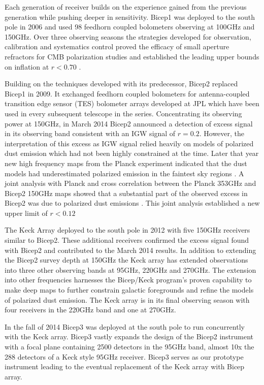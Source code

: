 \documentclass[12pt]{article}
\begin{document}
Each generation of receiver builds on the experience gained from
the previous generation while pushing deeper in sensitivity.
Bicep1 was deployed to the south pole in 2006 and used 98 feedhorn coupled
bolometers observing at 100GHz and 150GHz. Over three observing seasons the
strategies developed for observation, calibration and systematics control
proved the efficacy of small aperture refractors for CMB polarization studies
and established the leading upper bounds on inflation at $r<0.70$
\cite{cite:Bicep1}.

Building on the techniques developed with its predecessor, Bicep2 replaced
Bicep1 in 2009. It exchanged feedhorn coupled bolometers for antenna-coupled
transition edge sensor (TES) bolometer arrays developed at JPL which have been
used in every subsequent telescope in the series. Concentrating its observing
power at 150GHz, in March 2014 Bicep2 announced a detection of excess signal
in its observing band consistent with an IGW signal of $r=0.2$\cite{cite:BK1}.
However, the interpretation of this excess as IGW signal relied heavily on
models of polarized dust emission which had not been highly constrained at the
time. Later that year new high frequency maps from the Planck experiment
indicated that the dust models had underestimated polarized emission in the
faintest sky regions \cite{cite:PlanckXIX}. A joint analysis with Planck and
cross correlation between the Planck 353GHz and Bicep2 150GHz maps showed that
a substantial part of the observed excess in Bicep2 was due to polarized dust
emissions \cite{cite:BKP}. This joint analysis established a new upper limit
of $r<0.12$

The Keck Array deployed to the south pole in 2012 with five 150GHz receivers
similar to Bicep2. These additional receivers confirmed the excess signal
found with Bicep2 and contributed to the March 2014 results. In addition to
extending the Bicep2 survey depth at 150GHz the Keck array has extended
observations into three other observing bands at 95GHz, 220GHz and 270GHz. The
extension into other frequencies harnesses the Bicep/Keck program's proven
capability to make deep maps to further constrain galactic foregrounds and
refine the models of polarized dust emission. The Keck array is in its final
observing season with four receivers in the 220GHz band and one at 270GHz.

In the fall of 2014 Bicep3 was deployed at the south pole to run concurrently
with the Keck array. Bicep3 vastly expands the design of the Bicep2 instrument with a
focal plane containing 2500 detectors in the 95GHz band, almost 10x the 288
detectors of a Keck style 95GHz receiver. Bicep3 serves as our prototype
instrument leading to the eventual replacement of the Keck array with Bicep
array.
\end{document}
